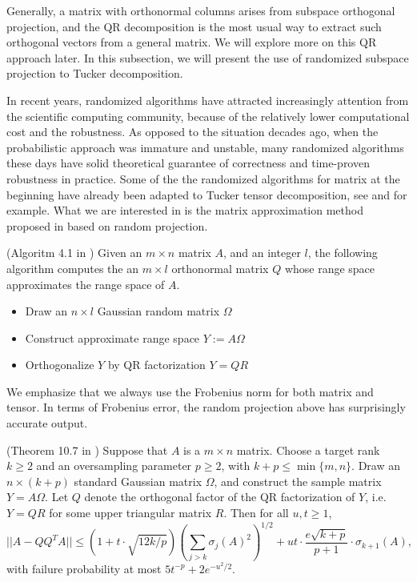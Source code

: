 \documentclass[12pt]{article}
\begin{document}
Generally, a matrix with orthonormal columns arises from subspace orthogonal projection, and the QR decomposition is the most usual way to extract such orthogonal vectors from a general matrix. We will explore more on this QR approach later. In this subsection, we will present the use of randomized subspace projection to Tucker decomposition.

In recent years, randomized algorithms have attracted increasingly attention from the scientific computing community, because of the relatively lower computational cost and the robustness. As opposed to the situation decades ago, when the probabilistic approach was immature and unstable, many randomized algorithms these days have solid theoretical guarantee of correctness and time-proven robustness in practice. Some of the the randomized algorithms for matrix at the beginning have already been adapted to Tucker tensor decomposition, see \cite{trand2007} and \cite{trandMACH} for example. What we are interested in is the matrix approximation method proposed in \cite{randAppro} based on random projection.

\begin{myalgo}{(Algoritm 4.1 in \cite{randAppro})}
Given an $m \times n$ matrix $A$, and an integer $l$, the following algorithm computes the an $m \times l$ orthonormal matrix $Q$ whose range space approximates the range space of $A$.
\begin{itemize}
\item Draw an $n \times l$ Gaussian random matrix $\Omega$
\item Construct approximate range space $Y := A\Omega$
\item Orthogonalize $Y$ by QR factorization $Y = QR$
\end{itemize}
\end{myalgo}

We emphasize that we always use the Frobenius norm for both matrix and tensor. In terms of Frobenius error, the random projection above has surprisingly accurate output.

\begin{mythm}{(Theorem 10.7 in \cite{randAppro})}
\label{thmrandappro}
Suppose that $A$ is a $m \times n$ matrix. Choose a target rank $k \geq 2$ and an oversampling parameter $p \geq 2$, with $k + p \leq \min\{m, n\}$. Draw an $n \times (k + p)$ standard Gaussian matrix $\Omega$, and construct the sample matrix $Y = A\Omega$. Let $Q$ denote the orthogonal factor of the QR factorization of  $Y$, i.e. $Y = QR$ for some upper triangular matrix $R$. Then for all $u, t \geq 1$, 
$$ || A - QQ^TA || \leq ( 1 + t \cdot \sqrt{12k/p}) (\sum_{j > k} \sigma_j(A)^2)^{1/2} + ut \cdot \frac{e \sqrt{k+p}}{p+1} \cdot \sigma_{k+1}(A),$$
with failure probability at most $5 t^{-p} + 2 e ^{-u^2 / 2}$.
\end{mythm}
\end{document}
